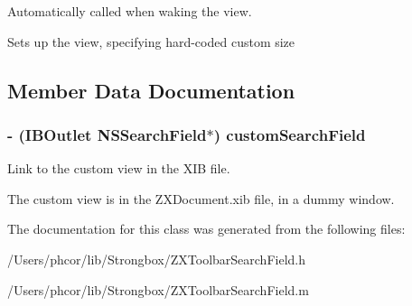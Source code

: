 Automatically called when waking the view. 

Sets up the view, specifying hard-coded custom size 

\subsection{Member Data Documentation}
\hypertarget{interface_z_x_toolbar_search_field_74f14a544b5f8091173aca4926615f0c}{
\subsubsection[{customSearchField}]{\setlength{\rightskip}{0pt plus 5cm}- (IBOutlet NSSearchField$\ast$) {\bf customSearchField}}}
\label{interface_z_x_toolbar_search_field_74f14a544b5f8091173aca4926615f0c}


Link to the custom view in the XIB file. 

The custom view is in the ZXDocument.xib file, in a dummy window. 

The documentation for this class was generated from the following files:\begin{CompactItemize}
\item 
/Users/phcor/lib/Strongbox/ZXToolbarSearchField.h\item 
/Users/phcor/lib/Strongbox/ZXToolbarSearchField.m\end{CompactItemize}
